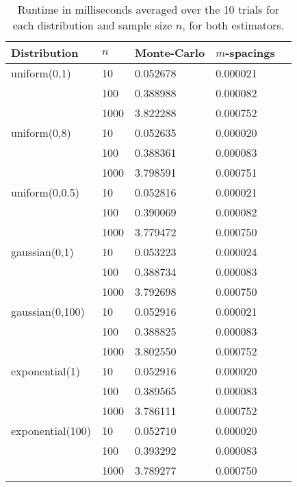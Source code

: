 \documentclass[12pt]{article}
\begin{document}
\begin{table}
\begin{center}
\begin{tabular}{lllll}
{\bf Distribution} &  {\bf $n$} & {\bf Monte-Carlo } & {\bf $m$-spacings}\\ \hline 
uniform(0,1) & 10 & 0.052678 & 0.000021 \\
 & 100 & 0.388988 & 0.000082 \\
 & 1000 & 3.822288 & 0.000752 \\ 
 
uniform(0,8) & 10 & 0.052635 & 0.000020 \\
 & 100 & 0.388361 & 0.000083 \\
 & 1000 & 3.798591 & 0.000751 \\ 
 
uniform(0,0.5) & 10 & 0.052816 & 0.000021 \\
 & 100 & 0.390069 & 0.000082 \\
 & 1000 & 3.779472 & 0.000750 \\ 
 
gaussian(0,1) & 10 & 0.053223 & 0.000024 \\
 & 100 & 0.388734 & 0.000083 \\
 & 1000 & 3.792698 & 0.000750 \\ 
 
gaussian(0,100) & 10 & 0.052916 & 0.000021 \\
 & 100 & 0.388825 & 0.000083 \\
 & 1000 & 3.802550 & 0.000752 \\ 
 
exponential(1) & 10 & 0.052916 & 0.000020 \\
 & 100 & 0.389565 & 0.000083 \\
 & 1000 & 3.786111 & 0.000752 \\ 
 
exponential(100) & 10 & 0.052710 & 0.000020 \\
 & 100 & 0.393292 & 0.000083 \\
 & 1000 & 3.789277 & 0.000750 \\ 
\end{tabular}
\caption{Runtime in milliseconds averaged over the 10 trials for each distribution and sample size $n$, for both estimators.}
\end{center}
\end{table}
\end{document}

